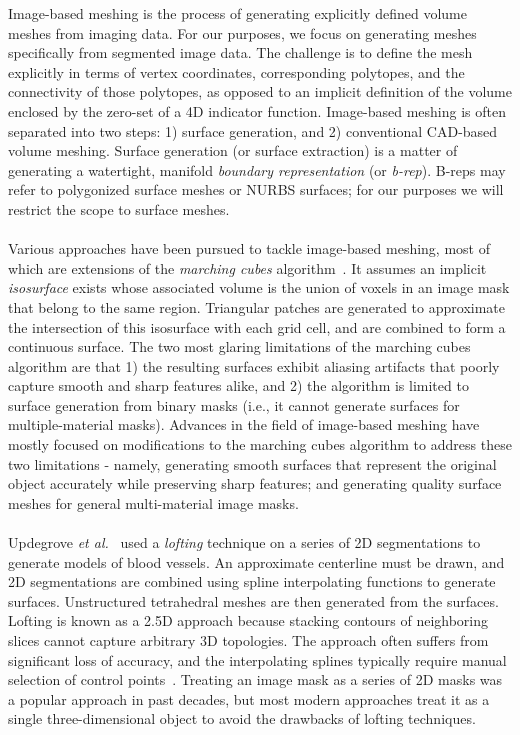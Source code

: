 %
Image-based meshing is the process of generating explicitly defined volume meshes from imaging data. For our purposes, we focus on generating meshes specifically from segmented image data. The challenge is to define the mesh explicitly in terms of vertex coordinates, corresponding polytopes, and the connectivity of those polytopes, as opposed to an implicit definition of the volume enclosed by the zero-set of a 4D indicator function. Image-based meshing is often separated into two steps: 1) surface generation, and 2) conventional CAD-based volume meshing. Surface generation (or surface extraction) is a matter of generating a watertight, manifold \textit{boundary representation} (or \textit{b-rep}). B-reps may refer to polygonized surface meshes or NURBS surfaces; for our purposes we will restrict the scope to surface meshes. \\ \\
%
Various approaches have been pursued to tackle image-based meshing, most of which are extensions of the \textit{marching cubes} algorithm~\cite{lorensen_1987}. It assumes an implicit \textit{isosurface} exists whose associated volume is the union of voxels in an image mask that belong to the same region. Triangular patches are generated to approximate the intersection of this isosurface with each grid cell, and are combined to form a continuous surface. The two most glaring limitations of the marching cubes algorithm are that 1) the resulting surfaces exhibit aliasing artifacts that poorly capture smooth and sharp features alike, and 2) the algorithm is limited to surface generation from binary masks (i.e., it cannot generate surfaces for multiple-material masks). Advances in the field of image-based meshing have mostly focused on modifications to the marching cubes algorithm to address these two limitations - namely, generating smooth surfaces that represent the original object accurately while preserving sharp features; and generating quality surface meshes for general multi-material image masks. \\ \\ 
%
Updegrove \textit{et al.}~\cite{updegrove_2016} used a \textit{lofting} technique on a series of 2D segmentations to generate models of blood vessels. An approximate centerline must be drawn, and 2D segmentations are combined using spline interpolating functions to generate surfaces. Unstructured tetrahedral meshes are then generated from the surfaces. Lofting is known as a 2.5D approach because stacking contours of neighboring slices cannot capture arbitrary 3D topologies. The approach often suffers from significant loss of accuracy, and the interpolating splines typically require manual selection of control points~\cite{young_2008}. Treating an image mask as a series of 2D masks was a popular approach in past decades, but most modern approaches treat it as a single three-dimensional object to avoid the drawbacks of lofting techniques. \\ \\
